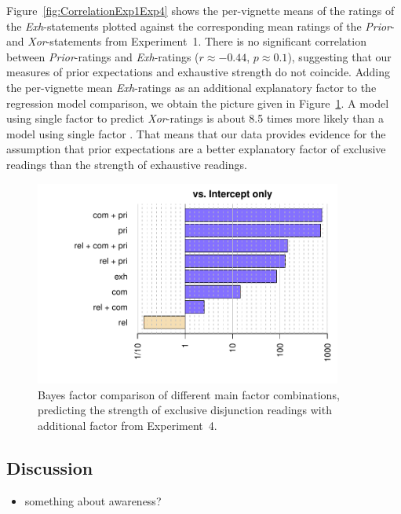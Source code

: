 \documentclass[12pt]{article}
\begin{document}
Figure~\ref{fig:CorrelationExp1Exp4} shows the per-vignette means of the ratings of the
\emph{Exh}-statements plotted against the corresponding mean ratings of the \emph{Prior}- and
\emph{Xor}-statements from Experiment~1. There is no significant correlation between
\emph{Prior}-ratings and \emph{Exh}-ratings ($r \approx -0.44$, $p \approx 0.1$), suggesting
that our measures of prior expectations and exhaustive strength do not coincide. Adding the
per-vignette mean \emph{Exh}-ratings as an additional explanatory factor \exh to the regression
model comparison, we obtain the picture given in Figure~\ref{fig:BayesFactorsExp4}. A model
using single factor \pri to predict \emph{Xor}-ratings is about 8.5 times more likely than a
model using single factor \exh. That means that our data provides evidence for the assumption
that prior expectations are a better explanatory factor of exclusive readings than the strength
of exhaustive readings.

\begin{figure}
  \centering
  \includegraphics[width=0.9\textwidth]{pics/bfsAllExp4.pdf}
  \caption{Bayes factor comparison of different main factor combinations, predicting the
    strength of exclusive disjunction readings with additional factor \exh from Experiment~4.}
\label{fig:BayesFactorsExp4}
\end{figure}

\subsection{Discussion}

\begin{itemize}
\item something about awareness?
\end{itemize}
\end{document}
